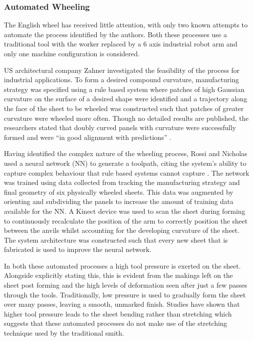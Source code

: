 \subsubsection{Automated Wheeling} \label{sec:MechEW}
The English wheel has received little attention, with only two known attempts to automate the process identified by the authors. Both these processes use a traditional tool with the worker replaced by a 6 axis industrial robot arm and only one machine configuration is considered. 

US architectural company Zahner investigated the feasibility of the process for industrial applications. To form a desired compound curvature, manufacturing strategy was specified using a rule based system where patches of high Gaussian curvature on the surface of a desired shape were identified and a trajectory along the face of the sheet to be wheeled was constructed such that patches of greater curvature were wheeled more often. Though no detailed results are published, the researchers stated that doubly curved panels with curvature were successfully formed and were ``in good alignment with predictions'' \citep{Vazquez2017RoboticWheeling,Vazquez2017EfficientSurfaces}. 

Having identified the complex nature of the wheeling process, Rossi and Nicholas used a neural network (NN) to generate a toolpath, citing the system's ability to capture complex behaviour that rule based systems cannot capture \citep{Rossi2018ModellingWheel, Rossi2018Re/LearningSurfaces}. The network was trained using data collected from tracking the manufacturing strategy and final geometry of six physically wheeled sheets. This data was augmented by orienting and subdividing the panels to increase the amount of training data available for the NN. A Kinect device was used to scan the sheet during forming to continuously recalculate the position of the arm to correctly position the sheet between the anvils whilst accounting for the developing curvature of the sheet. The system architecture was constructed such that every new sheet that is fabricated is used to improve the neural network.

In both these automated processes a high tool pressure is exerted on the sheet. Alongside explicitly stating this, this is evident from the makings left on the sheet post forming and the high levels of deformation seen after just a few passes through the tools. Traditionally, low pressure is used to gradually form the sheet over many passes, leaving a smooth, unmarked finish. Studies have shown that higher tool pressure leads to the sheet bending rather than stretching \citep{Bowen2021NumericalProcess} which suggests that these automated processes do not make use of the stretching technique used by the traditional smith.


